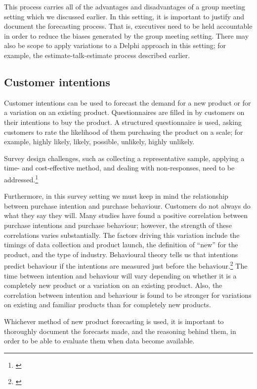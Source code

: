 \documentclass[]{book}
\let\rmarkdownfootnote\footnote%
\def\footnote{\protect\rmarkdownfootnote}
\begin{document}
This process carries all of the advantages and disadvantages of a group meeting setting which we discussed earlier. In this setting, it is important to justify and document the forecasting process. That is, executives need to be held accountable in order to reduce the biases generated by the group meeting setting. There may also be scope to apply variations to a Delphi approach in this setting; for example, the estimate-talk-estimate process described earlier.

\hypertarget{customer-intentions}{%
\subsection*{Customer intentions}\label{customer-intentions}}

Customer intentions can be used to forecast the demand for a new product or for a variation on an existing product. Questionnaires are filled in by customers on their intentions to buy the product. A structured questionnaire is used, asking customers to rate the likelihood of them purchasing the product on a scale; for example, highly likely, likely, possible, unlikely, highly unlikely.

Survey design challenges, such as collecting a representative sample, applying a time- and cost-effective method, and dealing with non-responses, need to be addressed.\footnote{\citet{Groves2009}}

Furthermore, in this survey setting we must keep in mind the relationship between purchase intention and purchase behaviour. Customers do not always do what they say they will. Many studies have found a positive correlation between purchase intentions and purchase behaviour; however, the strength of these correlations varies substantially. The factors driving this variation include the timings of data collection and product launch, the definition of ``new'' for the product, and the type of industry. Behavioural theory tells us that intentions predict behaviour if the intentions are measured just before the behaviour.\footnote{\citet{RW94}} The time between intention and behaviour will vary depending on whether it is a completely new product or a variation on an existing product. Also, the correlation between intention and behaviour is found to be stronger for variations on existing and familiar products than for completely new products.

Whichever method of new product forecasting is used, it is important to thoroughly document the forecasts made, and the reasoning behind them, in order to be able to evaluate them when data become available.
\end{document}
